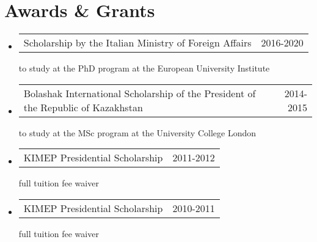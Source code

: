\documentclass[a4, 11pt]{article}
\makeatletter
\newcommand{\resumeOtherHeading}[2]{
      \item
      \begin{tabularx}{0.97\textwidth}{X@{\extracolsep{2em}}r}
        #1 & #2
      \end{tabularx}
    }
\newcommand{\resumeSubHeadingListStart}{\begin{itemize}[leftmargin=0.15in, label={}]}
\newcommand{\resumeSubHeadingListEnd}{\end{itemize}}
\makeatother
\begin{document}
    \section{Awards \& Grants}
  \resumeSubHeadingListStart
        \resumeOtherHeading
          {  {Scholarship by the Italian Ministry of Foreign Affairs}{} }
          { 2016-2020 }
          {to study at the PhD program at the European University Institute}
        \resumeOtherHeading
          {  {Bolashak International Scholarship of the President of the Republic of Kazakhstan}{} }
          { 2014-2015 }
          {to study at the MSc program at the University College London}
        \resumeOtherHeading
          {  {KIMEP Presidential Scholarship}{} }
          { 2011-2012 }
          {full tuition fee waiver}
        \resumeOtherHeading
          {  {KIMEP Presidential Scholarship}{} }
          { 2010-2011 }
          {full tuition fee waiver}
    \resumeSubHeadingListEnd

    
\end{document}
